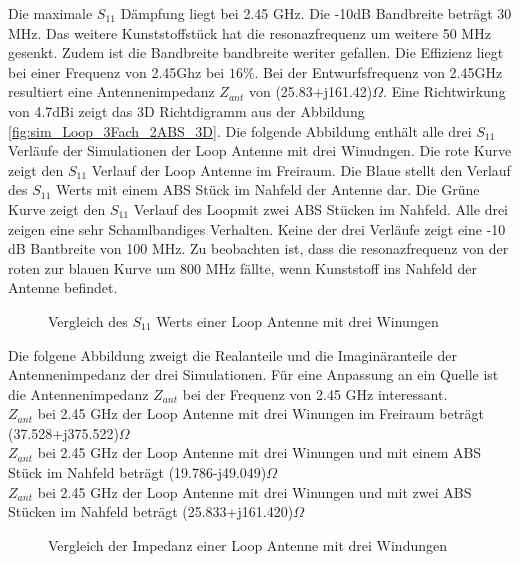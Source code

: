 Die maximale $S_{11}$ Dämpfung liegt bei 2.45 GHz. Die -10dB Bandbreite beträgt 30 MHz. Das weitere Kunststoffstück hat die resonazfrequenz um weitere 50 MHz gesenkt. Zudem ist die Bandbreite bandbreite weriter gefallen. Die Effizienz liegt bei einer Frequenz von 2.45Ghz bei $16\%$. Bei der Entwurfsfrequenz von 2.45GHz resultiert eine Antennenimpedanz $Z_{ant}$ von (25.83+j161.42)$\Omega$.
Eine Richtwirkung von 4.7dBi zeigt das 3D Richtdigramm aus der Abbildung \ref{fig:sim_Loop_3Fach_2ABS_3D}.
\newpage
Die folgende Abbildung enthält alle drei $S_{11}$ Verläufe der Simulationen der Loop Antenne mit drei Winudngen. Die rote Kurve zeigt den $S_{11}$ Verlauf der Loop Antenne im Freiraum. Die Blaue stellt den Verlauf des $S_{11}$ Werts mit einem ABS Stück im Nahfeld der Antenne dar. Die Grüne Kurve zeigt den $S_{11}$ Verlauf des Loopmit zwei ABS Stücken im Nahfeld. Alle drei zeigen eine sehr Schamlbandiges Verhalten. Keine der drei Verläufe zeigt eine -10 dB Bantbreite von 100 MHz. Zu beobachten ist, dass die resonazfrequenz von der roten zur blauen Kurve um 800 MHz fällte, wenn Kunststoff ins Nahfeld der Antenne befindet.
\begin{figure}[!ht]
	\centering
	\begingroup
	
	\endgroup
	\caption{Vergleich des $S_{11}$ Werts einer Loop Antenne mit drei Winungen}
	\label{S11_Loop_3N_Vergleich_Simulation}
\end{figure}
\newpage
Die folgene Abbildung zweigt die Realanteile und die Imaginäranteile der Antennenimpedanz der drei Simulationen. Für eine Anpassung an ein Quelle ist die Antennenimpedanz $Z_{ant}$ bei der Frequenz von 2.45 GHz interessant.\\
$Z_{ant}$ bei 2.45 GHz der Loop Antenne mit drei Winungen im Freiraum beträgt (37.528+j375.522)$\Omega$\\
$Z_{ant}$ bei 2.45 GHz der Loop Antenne mit drei Winungen und mit einem ABS Stück im Nahfeld beträgt (19.786-j49.049)$\Omega$\\
$Z_{ant}$ bei 2.45 GHz der Loop Antenne mit drei Winungen und mit zwei ABS Stücken im Nahfeld beträgt (25.833+j161.420)$\Omega$
\begin{figure}[!ht]
	\centering
	\begingroup
	
	\endgroup
	\caption{Vergleich der Impedanz einer Loop Antenne mit drei Windungen}
	\label{Impedanz_Loop_3N_Vergleich_Simulation}
\end{figure}

